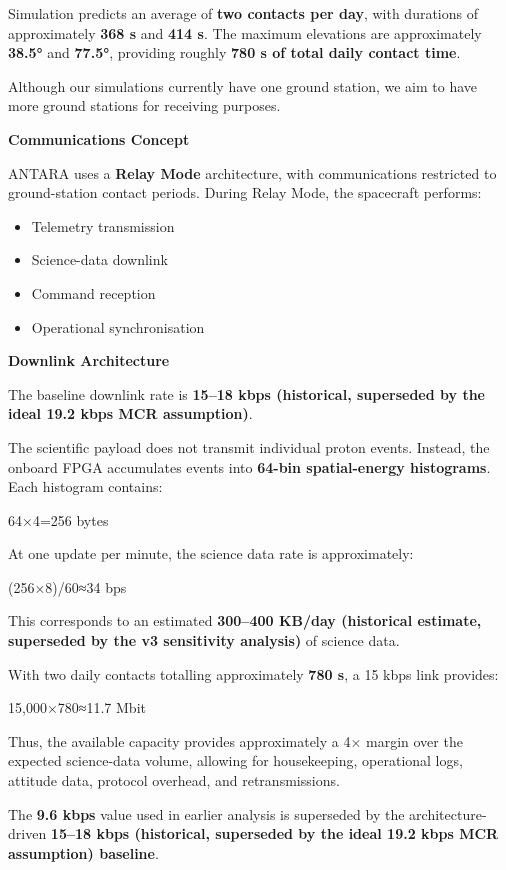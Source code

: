 Simulation predicts an average of \textbf{two contacts per day}, with
durations of approximately \textbf{368 s} and \textbf{414 s}. The
maximum elevations are approximately \textbf{38.5°} and \textbf{77.5°},
providing roughly \textbf{780 s of total daily contact time}.

Although our simulations currently have one ground station, we aim to
have more ground stations for receiving purposes.

\textbf{Communications Concept}

ANTARA uses a \textbf{Relay Mode} architecture, with communications
restricted to ground-station contact periods. During Relay Mode, the
spacecraft performs:

\begin{itemize}
\item
  Telemetry transmission
\item
  Science-data downlink
\item
  Command reception
\item
  Operational synchronisation
\end{itemize}

\textbf{Downlink Architecture}

The baseline downlink rate is \textbf{15--18 kbps (historical, superseded by the ideal 19.2 kbps MCR assumption)}.

The scientific payload does not transmit individual proton events.
Instead, the onboard FPGA accumulates events into \textbf{64-bin
spatial-energy histograms}. Each histogram contains:

64×4=256 bytes

At one update per minute, the science data rate is approximately:

(256×8)/60≈34 bps

This corresponds to an estimated \textbf{300--400 KB/day (historical estimate, superseded by the v3 sensitivity analysis)} of science
data.

With two daily contacts totalling approximately \textbf{780 s}, a 15
kbps link provides:

15,000×780≈11.7 Mbit

Thus, the available capacity provides approximately a 4× margin over the
expected science-data volume, allowing for housekeeping, operational
logs, attitude data, protocol overhead, and retransmissions.

The \textbf{9.6 kbps} value used in earlier analysis is superseded by
the architecture-driven \textbf{15--18 kbps (historical, superseded by the ideal 19.2 kbps MCR assumption) baseline}.

